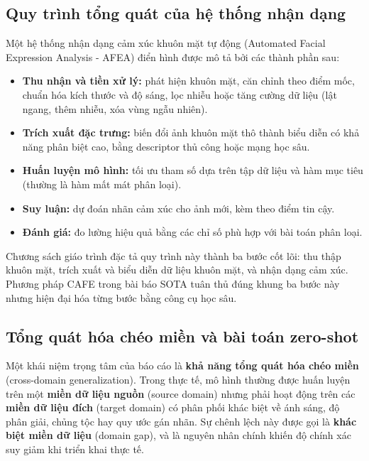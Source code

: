 \subsection{Quy trình tổng quát của hệ thống nhận dạng}
Một hệ thống nhận dạng cảm xúc khuôn mặt tự động (Automated Facial Expression Analysis - AFEA) điển hình được mô tả bởi các thành phần sau:
\begin{itemize}
    \item \textbf{Thu nhận và tiền xử lý:} phát hiện khuôn mặt, căn chỉnh theo điểm mốc, chuẩn hóa kích thước và độ sáng, lọc nhiễu hoặc tăng cường dữ liệu (lật ngang, thêm nhiễu, xóa vùng ngẫu nhiên).
    \item \textbf{Trích xuất đặc trưng:} biến đổi ảnh khuôn mặt thô thành biểu diễn có khả năng phân biệt cao, bằng descriptor thủ công hoặc mạng học sâu.
    \item \textbf{Huấn luyện mô hình:} tối ưu tham số dựa trên tập dữ liệu và hàm mục tiêu (thường là hàm mất mát phân loại).
    \item \textbf{Suy luận:} dự đoán nhãn cảm xúc cho ảnh mới, kèm theo điểm tin cậy.
    \item \textbf{Đánh giá:} đo lường hiệu quả bằng các chỉ số phù hợp với bài toán phân loại.
\end{itemize}
Chương sách giáo trình đặc tả quy trình này thành ba bước cốt lõi: thu thập khuôn mặt, trích xuất và biểu diễn dữ liệu khuôn mặt, và nhận dạng cảm xúc. Phương pháp CAFE trong bài báo SOTA tuân thủ đúng khung ba bước này nhưng hiện đại hóa từng bước bằng công cụ học sâu.

\subsection{Tổng quát hóa chéo miền và bài toán zero-shot}
Một khái niệm trọng tâm của báo cáo là \textbf{khả năng tổng quát hóa chéo miền} (cross-domain generalization). Trong thực tế, mô hình thường được huấn luyện trên một \textbf{miền dữ liệu nguồn} (source domain) nhưng phải hoạt động trên các \textbf{miền dữ liệu đích} (target domain) có phân phối khác biệt về ánh sáng, độ phân giải, chủng tộc hay quy ước gán nhãn. Sự chênh lệch này được gọi là \textbf{khác biệt miền dữ liệu} (domain gap), và là nguyên nhân chính khiến độ chính xác suy giảm khi triển khai thực tế.

